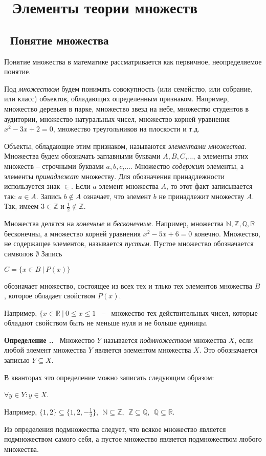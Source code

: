 \documentclass[a4paper,14pt]{article}
\renewcommand\thesection{\arabic{section}.}
\newcounter{definition}[section]
\newenvironment{definition}{\refstepcounter{definition}\par\medskip\textbf{Определение \thesection\thedefinition.}~}{\medskip}
\begin{document}
\newpage
\section{~Элементы теории множеств}
\subsection{~Понятие множества}
\par Понятие множества в математике рассматривается как первичное, неопределяемое понятие.
\par Под \emph{множеством} будем понимать совокупность (или семейство, или собрание, или класс) объектов, обладающих определенным признаком. Например, множество деревьев в парке, множество звезд на небе, множество студентов в аудитории, множество натуральных чисел, множество корней уравнения $x^2 - 3x + 2 = 0$, множество треугольников на плоскости и т.д.
\par Объекты, обладающие этим признаком, называются \emph{элементами множества}. Множества будем обозначать заглавными буквами $A, B, C$,..., а элементы этих множеств -- строчными буквами $a, b, c$,.... Множество \emph{содержит} элементы, а элементы \emph{принадлежат} множеству. Для обозначения принадлежности используется знак $\in$. Если $a$ элемент множества $A$, то этот факт записывается так: $a \in A$. Запись $b \notin A$ означает, что элемент $b$ не принадлежит множеству $A$. Так, имеем $3 \in \mathbb{Z}$ и $\frac{1}{2} \notin \mathbb{Z}$.
\par Множества делятся на \emph{конечные} и \emph{бесконечные}. Например, множества $\mathbb{N}, \mathbb{Z}, \mathbb{Q}, \mathbb{R}$ бесконечны, а множество корней уравнения $x^2 -5x + 6 = 0$ конечно. Множество, не содержащее элементов, называется \emph{пустым}. Пустое множество обозначается символов $\emptyset$ Запись
\begin{center}
    $C = \{x \in B~|~P(x)\}$
\end{center}
обозначает множество, состоящее из всех тех и тлько тех элементов множества $B$, которое обладает свойством $P(x)$.
\par Например, $\{x \in \mathbb{R}~|~0 \leqslant x \leqslant 1$ ~--~ множество тех действительных чисел, которые обладают свойством быть не меньше нуля и не больше единицы.
\begin{definition}
    Множество $Y$ называется \emph{подмножеством} множества $X$, если любой элемент множества $Y$ является элементом множества $X$. Это обозначается записью $Y \subseteq X$.
    \par В кванторах это определение можно записать следующим образом:
    \begin{center}
        $\forall y \in Y : y \in X$.
    \end{center}
    \par Например, $\{1,2\} \subseteq \{1,2,-\frac{1}{2}\},~~\mathbb{N} \subseteq \mathbb{Z},~~\mathbb{Z} \subseteq \mathbb{Q},~~\mathbb{Q} \subseteq \mathbb{R}$.
    \par Из определения подмножества следует, что всякое множество является подмножеством самого себя, а пустое множество является подмножеством любого множества.
\end{definition}
\end{document}
